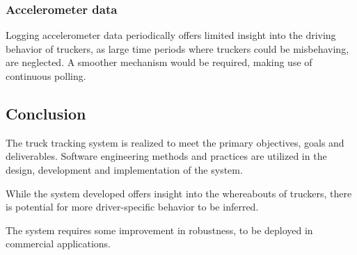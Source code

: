 \subsubsection{Accelerometer data}
Logging accelerometer data periodically offers limited insight into the driving behavior of truckers, as large time periods where truckers could be misbehaving, are neglected.
A smoother mechanism would be required, making use of continuous polling.

\subsection{Conclusion}
The truck tracking system is realized to meet the primary objectives, goals and deliverables.
Software engineering methods and practices are utilized in the design, development and implementation of the system.

While the system developed offers insight into the whereabouts of truckers, there is potential for more driver-specific behavior to be inferred.

The system requires some improvement in robustness, to be deployed in commercial applications.
